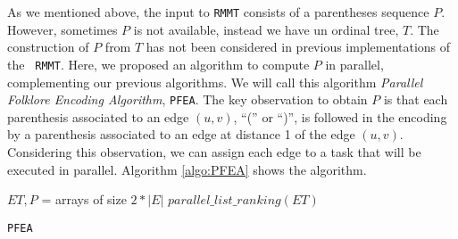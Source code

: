 As we mentioned above, the input to {\tt RMMT} consists of a
parentheses sequence $P$. However, sometimes $P$ is not available,
instead we have un ordinal tree, $T$. The construction of $P$ from $T$
has not been considered in previous implementations of the {\tt
  RMMT}. Here, we proposed an algorithm to compute $P$ in parallel,
complementing our previous algorithms. We will call this algorithm
\emph{Parallel Folklore Encoding Algorithm}, {\tt PFEA}. The key
observation to obtain $P$ is that each parenthesis associated to an
edge $(u,v)$, ``('' or ``)'', is followed in the encoding by a
parenthesis associated to an edge at distance 1 of the edge
$(u,v)$. Considering this observation, we can assign each edge to a task
that will be executed in parallel. Algorithm \ref{algo:PFEA} shows the algorithm.

\begin{algorithm}[t]
\small
\SetVlineSkip{-2cm}
  \LinesNumbered
  \SetAlgoNoEnd
  \DontPrintSemicolon
  \BlankLine%
  $ET, P$ = arrays of size $2*|E|$\;
  \BlankLine
  $parallel\_list\_ranking(ET)$\;
  \BlankLine

%  	
  \caption{{\tt PFEA}}
  \label{algo:PFEA}
\end{algorithm}
\normalsize

